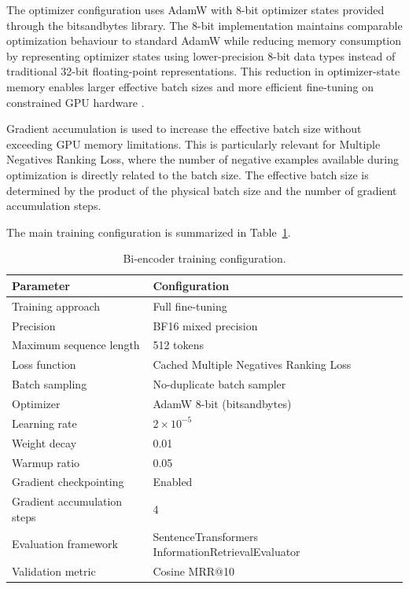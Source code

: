 The optimizer configuration uses AdamW with 8-bit optimizer states provided through the bitsandbytes library. The 8-bit implementation maintains comparable optimization behaviour to standard AdamW while reducing memory consumption by representing optimizer states using lower-precision 8-bit data types instead of traditional 32-bit floating-point representations. This reduction in optimizer-state memory enables larger effective batch sizes and more efficient fine-tuning on constrained GPU hardware \cite{dettmers2022optimizers}.

Gradient accumulation is used to increase the effective batch size without exceeding GPU memory limitations. This is particularly relevant for Multiple Negatives Ranking Loss, where the number of negative examples available during optimization is directly related to the batch size. The effective batch size is determined by the product of the physical batch size and the number of gradient accumulation steps.

The main training configuration is summarized in Table~\ref{tab:bi_encoder_training}.

\begin{table}[ht]
\centering
\caption{Bi-encoder training configuration.}
\label{tab:bi_encoder_training}
\begin{tabular}{ll}
\hline
\textbf{Parameter} & \textbf{Configuration} \\
\hline
Training approach & Full fine-tuning \\
Precision & BF16 mixed precision \\
Maximum sequence length & 512 tokens \\
Loss function & Cached Multiple Negatives Ranking Loss \\
Batch sampling & No-duplicate batch sampler \\
Optimizer & AdamW 8-bit (bitsandbytes) \\
Learning rate & $2 \times 10^{-5}$ \\
Weight decay & 0.01 \\
Warmup ratio & 0.05 \\
Gradient checkpointing & Enabled \\
Gradient accumulation steps & 4 \\
Evaluation framework & SentenceTransformers InformationRetrievalEvaluator \\
Validation metric & Cosine MRR@10 \\
\hline
\end{tabular}
\end{table}

